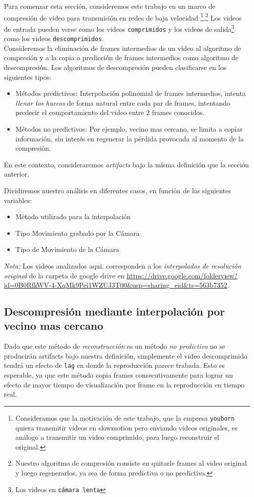 Para comenzar esta sección, consideremos este trabajo en un marco de compresión de video para transmisión en redes de baja velocidad \footnote{Consideramos que la motivación de este trabajo, que la empresa \texttt{youborn} quiera transmitir videos en slowmotion pero enviando videos originales, es análogo a transmitir un video comprimido, para luego reconstruir el original.}.\footnote{Nuestro algoritmo de compresión consiste en quitarle frames al video original y luego regenerarlos, ya sea de forma predictiva o no predictiva.} Los videos de entrada pueden verse como los videos \texttt{comprimidos} y los videos de salida\footnote{Los videos en \texttt{cámara lenta}} como los videos \texttt{descomprimidos}.\\

Consideremos la eliminación de frames intermedios de un video al algoritmo de compresión y a la copia o predicción de frames intermedios como algoritmo de descompresión. Los algoritmos de descompresión pueden clasificarse en los siguientes tipos:
\begin{itemize}
	\item Métodos predictivos: Interpolación polinomial de frames intermedios, intenta \emph{llenar los huecos} de forma natural entre cada par de frames, intentando predecir el comportamiento del video entre 2 frames conocidos.
	\item Métodos no predictivos: Por ejemplo, vecino mas cercano, se limita a copiar información, sin interés en regenerar la pérdida provocada al momento de la compresión.
\end{itemize}

En este contexto, consideraremos \emph{artifacts} bajo la misma definición que la sección anterior.

Dividiremos nuestro análisis en diferentes casos, en función de las siguientes variables:
\begin{itemize}
	\item Método utilizado para la interpolación
	\item Tipo Movimiento grabado por la Cámara
	\item Tipo de Movimiento de la Cámara
\end{itemize}

\emph{Nota:} Los videos analizados aqui, corresponden a los \emph{interpolados de resolución original} de la carpeta de google drive en \url{https://drive.google.com/folderview?id=0B0RfkWV-4-XqMk9Pei1WZUJ3T00&usp=sharing_eid&ts=563b7352}.

\subsection{Descompresión mediante interpolación por vecino mas cercano}
Dado que este método de \emph{reconstrucción} es un método \emph{no predictivo} no se producirán artifacts bajo nuestra definición, simplemente el video descomprimido tendrá un efecto de \texttt{lag} en donde la reproducción parece trabada. Esto es esperable, ya que este método copia frames consecutivamente para lograr un efecto de mayor tiempo de visualización por frame en la reproducción en tiempo real. 

